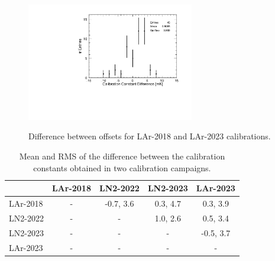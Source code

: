 \begin{figure}[htbp]
\centering
{\includegraphics[width=0.65\textwidth]{images/figure_20.pdf}}
\caption{Difference between offsets for LAr-2018 and LAr-2023 calibrations.}
\label{fig:LAr2018AllDiff}
\end{figure}

\begin{table}[htbp]
\begin{center}
\begin{tabular}{l c c c c}
         & LAr-2018 & LN2-2022 & LN2-2023 & LAr-2023  \\ \hline
LAr-2018 &    -     & -0.7, 3.6& 0.3, 4.7 & 0.3, 3.9 \\
LN2-2022 &    -     &    -     & 1.0, 2.6 &  0.5, 3.4 \\
LN2-2023 &    -     &    -     &    -     & -0.5, 3.7 \\
LAr-2023 &    -     &    -     &    -     &     -     \\
\end{tabular}
\end{center}
\caption{Mean and RMS of the difference between the calibration constants obtained in two calibration campaigns.}
\label{tab:calib_comparison}
\end{table}

